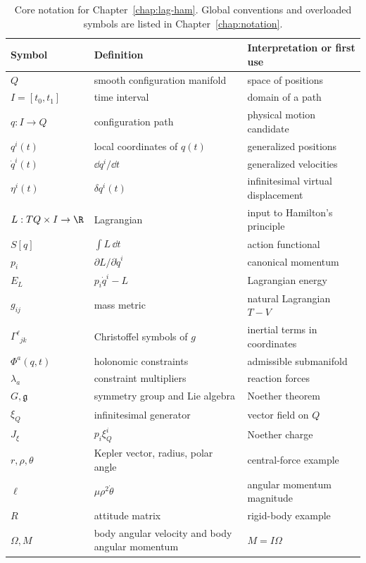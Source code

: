 \begin{table}[htbp]
\centering
\caption{Core notation for Chapter~\ref{chap:lag-ham}. Global conventions and
overloaded symbols are listed in Chapter~\ref{chap:notation}.}
\label{tab:lag-ham-notation}
\small
\begin{tabular}{p{}p{}p{}}
\toprule
Symbol & Definition & Interpretation or first use\\
\midrule
\(Q\) & smooth configuration manifold & space of positions\\
\(I=[t_0,t_1]\) & time interval & domain of a path\\
\(q:I\to Q\) & configuration path & physical motion candidate\\
\(q^i(t)\) & local coordinates of \(q(t)\) & generalized positions\\
\(\dot q^i(t)\) & \(\dd q^i/\dd t\) & generalized velocities\\
\(\eta^i(t)\) & \(\delta q^i(t)\) & infinitesimal virtual displacement\\
\(L:TQ\times I\to\R\) & Lagrangian & input to Hamilton's principle\\
\(S[q]\) & \(\int L\,\dd t\) & action functional\\
\(p_i\) & \(\partial L/\partial \dot q^i\) & canonical momentum\\
\(E_L\) & \(p_i\dot q^i-L\) & Lagrangian energy\\
\(g_{ij}\) & mass metric & natural Lagrangian \(T-V\)\\
\(\Gamma^\ell{}_{jk}\) & Christoffel symbols of \(g\) & inertial terms in coordinates\\
\(\Phi^a(q,t)\) & holonomic constraints & admissible submanifold\\
\(\lambda_a\) & constraint multipliers & reaction forces\\
\(G,\mathfrak g\) & symmetry group and Lie algebra & Noether theorem\\
\(\xi_Q\) & infinitesimal generator & vector field on \(Q\)\\
\(J_\xi\) & \(p_i\xi_Q^i\) & Noether charge\\
\(r,\rho,\theta\) & Kepler vector, radius, polar angle & central-force example\\
\(\ell\) & \(\mu\rho^2\dot\theta\) & angular momentum magnitude\\
\(R\) & attitude matrix & rigid-body example\\
\(\Omega,M\) & body angular velocity and body angular momentum & \(M=I\Omega\)\\

\end{tabular}
\end{table}
